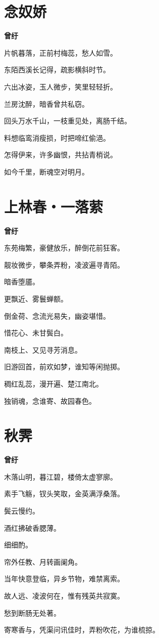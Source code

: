 \documentclass[12pt,a4paper]{ctexbook}
\begin{document}
\section{念奴娇}
\textbf{曾纡}\par\vspace{0.5em}
片帆暮落，正前村梅蕊，愁人如雪。\par
东陌西溪长记得，疏影横斜时节。\par
六出冰姿，玉人微步，笑里轻轻折。\par
兰房沈醉，暗香曾共私窃。\par
回头万水千山，一枝重见处，离肠千结。\par
料想临鸾消瘦损，时把啼红偷浥。\par
怎得伊来，许多幽恨，共拈青梢说。\par
如今千里，断魂空对明月。\par

\section{上林春・一落萦}
\textbf{曾纡}\par\vspace{0.5em}
东苑梅繁，豪健放乐，醉倒花前狂客。\par
靓妆微步，攀条弄粉，凌波遍寻青陌。\par
暗香堕靥。\par
更飘近、雾鬟蝉额。\par
倒金荷、念流光易失，幽姿堪惜。\par
惜花心、未甘鬓白。\par
南枝上、又见寻芳消息。\par
旧游回首，前欢如梦，谁知等闲抛掷。\par
稠红乱蕊，漫开遍、楚江南北。\par
独销魂，念谁寄、故园春色。\par

\section{秋霁}
\textbf{曾纡}\par\vspace{0.5em}
木落山明，暮江碧，楼倚太虚寥廓。\par
素手飞觞，钗头笑取，金英满浮桑落。\par
鬓云慢约。\par
酒红拂破香腮薄。\par
细细酌。\par
帘外任教、月转画阑角。\par
当年快意登临，异乡节物，难禁离索。\par
故人远、凌波何在，惟有残英共寂寞。\par
愁到断肠无处著。\par
寄寒香与，凭渠问讯佳时，弄粉吹花，为谁梳掠。\par
\end{document}
